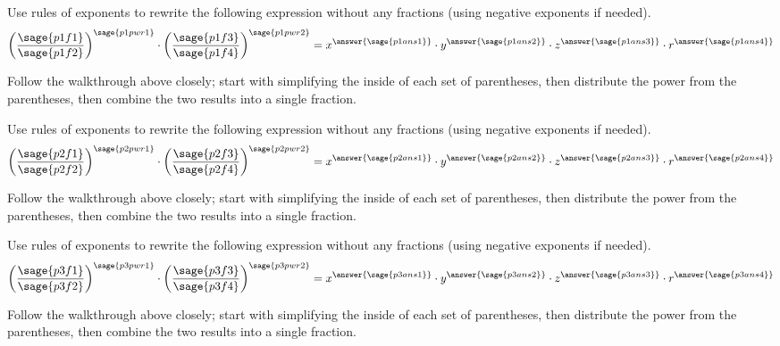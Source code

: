 \documentclass{ximera}
\begin{document}
\begin{example}
\begin{tabular}{rll}
\end{tabular}
\renewcommand{\arraystretch}{1}
\end{example}

\begin{problem}
    Use rules of exponents to rewrite the following expression without any fractions (using negative exponents if needed).
    \[
        \left(\frac{\sage{p1f1}}{\sage{p1f2}}\right)^{\sage{p1pwr1}} \cdot \left(\frac{\sage{p1f3}}{\sage{p1f4}}\right)^{\sage{p1pwr2}} = x^{\answer{\sage{p1ans1}}}\cdot y^{\answer{\sage{p1ans2}}}\cdot z^{\answer{\sage{p1ans3}}} \cdot r^{\answer{\sage{p1ans4}}}
    \]
    \begin{feedback}
        Follow the walkthrough above closely; start with simplifying the inside of each set of parentheses, then distribute the power from the parentheses, then combine the two results into a single fraction. 
    \end{feedback}
\end{problem}


\begin{problem}
    Use rules of exponents to rewrite the following expression without any fractions (using negative exponents if needed).
    \[
        \left(\frac{\sage{p2f1}}{\sage{p2f2}}\right)^{\sage{p2pwr1}} \cdot \left(\frac{\sage{p2f3}}{\sage{p2f4}}\right)^{\sage{p2pwr2}} = x^{\answer{\sage{p2ans1}}}\cdot y^{\answer{\sage{p2ans2}}}\cdot z^{\answer{\sage{p2ans3}}} \cdot r^{\answer{\sage{p2ans4}}}
    \]
    \begin{feedback}
        Follow the walkthrough above closely; start with simplifying the inside of each set of parentheses, then distribute the power from the parentheses, then combine the two results into a single fraction. 
    \end{feedback}
\end{problem}


\begin{problem}
    Use rules of exponents to rewrite the following expression without any fractions (using negative exponents if needed).
    \[
        \left(\frac{\sage{p3f1}}{\sage{p3f2}}\right)^{\sage{p3pwr1}} \cdot \left(\frac{\sage{p3f3}}{\sage{p3f4}}\right)^{\sage{p3pwr2}} = x^{\answer{\sage{p3ans1}}}\cdot y^{\answer{\sage{p3ans2}}}\cdot z^{\answer{\sage{p3ans3}}} \cdot r^{\answer{\sage{p3ans4}}}
    \]
    \begin{feedback}
        Follow the walkthrough above closely; start with simplifying the inside of each set of parentheses, then distribute the power from the parentheses, then combine the two results into a single fraction. 
    \end{feedback}
\end{problem}
\end{document}
